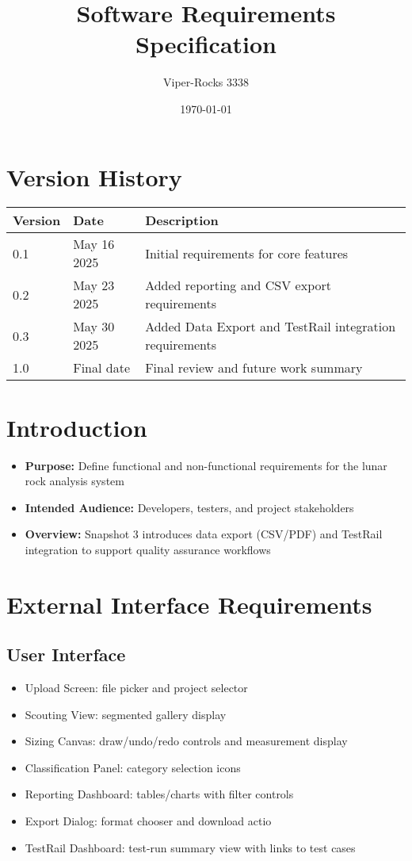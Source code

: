 \documentclass{article}
\title{Software Requirements Specification}
\author{Viper-Rocks 3338}
\date{\today}
\begin{document}
\maketitle

\tableofcontents
\newpage

\section*{Version History}
\begin{tabular}{|l|l|p{8cm}|}
\hline
\textbf{Version} & \textbf{Date}       & \textbf{Description} \\ \hline
0.1   & May 16 2025      & Initial requirements for core features \\ \hline
0.2   & May 23 2025       & Added reporting and CSV export requirements \\ \hline
0.3   & May 30 2025               & Added Data Export and TestRail integration requirements \\ \hline
1.0   & Final date            & Final review and future work summary \\ \hline
\end{tabular}

\section{Introduction}
\begin{itemize}
  \item \textbf{Purpose:} Define functional and non-functional requirements for the lunar rock analysis system
  \item \textbf{Intended Audience:} Developers, testers, and project stakeholders
  \item \textbf{Overview:} Snapshot 3 introduces data export (CSV/PDF) and TestRail integration to support quality assurance workflows
\end{itemize}

\section{External Interface Requirements}
\subsection{User Interface}
\begin{itemize}
  \item Upload Screen: file picker and project selector
  \item Scouting View: segmented gallery display
  \item Sizing Canvas: draw/undo/redo controls and measurement display
  \item Classification Panel: category selection icons
  \item Reporting Dashboard: tables/charts with filter controls
  \item Export Dialog: format chooser and download actio
  \item TestRail Dashboard: test-run summary view with links to test cases
\end{itemize}
\end{document}
